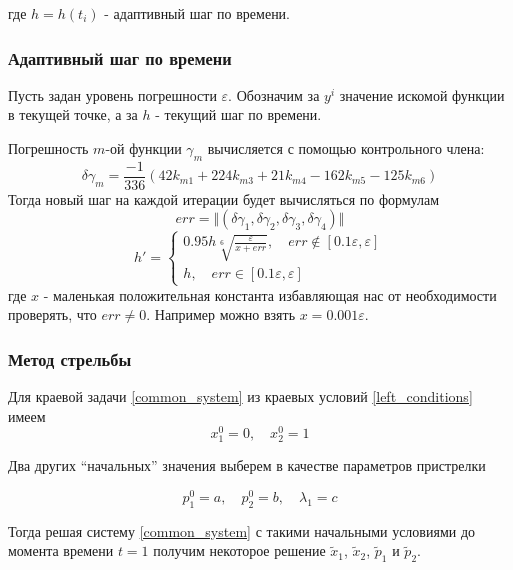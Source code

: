 \documentclass[a4paper,12pt]{article}
\begin{document}
где \(h=h(t_i)\) - адаптивный шаг по времени.

\subsubsection*{Адаптивный шаг по времени}

Пусть задан уровень погрешности \(\varepsilon\). Обозначим за \(y^i\)
значение искомой функции в текущей точке, а за \(h\) - текущий шаг по
времени.

Погрешность \(m\)-ой функции \(\gamma_{m}\) вычисляется с помощью контрольного члена:
\begin{equation*}
  \delta\gamma_{m} = \frac{-1}{336}\left(42 k_{m1}+224k_{m3}+21k_{m4}-162 k_{m5}-125 k_{m6}\right)
\end{equation*}
Тогда новый шаг на каждой итерации будет вычисляться по формулам
\begin{equation*}
  err = \Vert (\delta\gamma_{1}, \delta\gamma_{2}, \delta\gamma_{3}, \delta\gamma_{4})\Vert
\end{equation*}
\begin{equation*}
  h'=\begin{cases}
    0.95 h \sqrt[6]{\frac{\varepsilon}{x+err}}, \quad err \not\in [0.1 \varepsilon, \varepsilon]\\
    h, \quad  err \in [0.1 \varepsilon, \varepsilon]
  \end{cases}
\end{equation*}
где \(x\) - маленькая
положительная константа избавляющая нас от необходимости проверять, что
\(err \neq 0\). Например можно взять \(x=0.001 \varepsilon\).

\subsubsection*{Метод стрельбы}

Для краевой задачи \cref{common_system} из краевых условий \cref{left_conditions} имеем
\begin{equation*}
  x_1^0=0, \quad x_2^0=1
\end{equation*}

Два других ``начальных'' значения выберем в качестве параметров
пристрелки

\begin{equation*}
  p_1^0=a, \quad p_2^0=b, \quad \lambda_1 =c
\end{equation*}

Тогда решая систему \cref{common_system} с такими начальными условиями до момента времени \(t=1\) получим некоторое решение \(\tilde{x}_1\), \(\tilde{x}_2\), \(\tilde{p}_1\) и \(\tilde{p}_2\).
\end{document}
